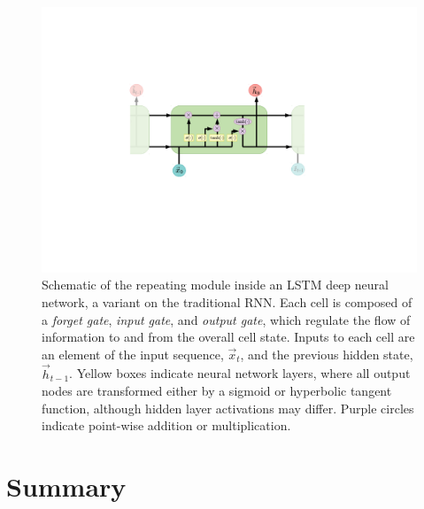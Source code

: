 \begin{figure}[htbp!] 
\centering 
\includegraphics[trim={5.5cm 6cm 7cm 5cm}, clip, width =1\linewidth]{Figures/ML/LSTM_cutaway.pdf}
\caption[A schematic of an LSTM neural network.]{Schematic of the repeating module inside an LSTM deep neural network, a variant on the traditional RNN. Each cell is composed of a \textit{forget gate}, \textit{input gate}, and \textit{output gate}, which regulate the flow of information to and from the overall cell state. Inputs to each cell are an element of the input sequence, $\vec{x}_{t}$, and the previous hidden state, $\vec{h}_{t-1}$. Yellow boxes indicate neural network layers, where all output nodes are transformed either by a sigmoid or hyperbolic tangent function, although hidden layer activations may differ. Purple circles indicate point-wise addition or multiplication.}
\label{fig:lstm_schematic}
\end{figure}
      
      
\section{Summary}      

